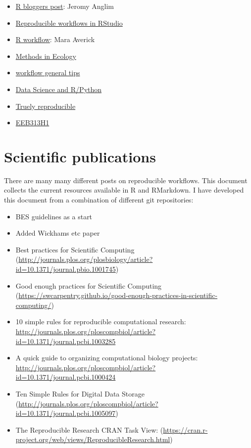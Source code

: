 \documentclass[
]{book}
\providecommand{\tightlist}{%
  \setlength{\itemsep}{0pt}\setlength{\parskip}{0pt}}
\begin{document}
\begin{itemize}
\tightlist
\item
  \href{https://www.r-bloggers.com/reproducible-research-and-r-workflow/}{R bloggers post}: Jeromy Anglim
\item
  \href{https://cyberhelp.sesync.org/basic-git-lesson/2016/08/25/}{Reproducible workflows in RStudio}
\item
  \href{https://maraaverick.rbind.io/2017/09/r-workflow-fun/}{R workflow}: Mara Averick
\item
  \href{https://methodsblog.com/2016/10/05/reproducibility-with-r/}{Methods in Ecology}
\item
  \href{https://csgillespie.github.io/efficientR/workflow.html}{workflow general tips}
\item
  \href{https://community.rstudio.com/t/data-science-project-template-for-r/3230}{Data Science and R/Python}
\item
  \href{https://timogrossenbacher.ch/2017/07/a-truly-reproducible-r-workflow/}{Truely reproducible}
\item
  \href{https://uoftcoders.github.io/rcourse/lec16-rmarkdown.html}{EEB313H1}
\end{itemize}

\hypertarget{scientific-publications}{%
\section{Scientific publications}\label{scientific-publications}}

There are many many different posts on reproducible workflows. This document collects the current resources available in R and RMarkdown. I have developed this document from a combination of different git repositories:

\begin{itemize}
\item
  BES guidelines as a start
\item
  Added Wickhams etc paper
\item
  Best practices for Scientific Computing (\url{http://journals.plos.org/plosbiology/article?id=10.1371/journal.pbio.1001745})
\item
  Good enough practices for Scientific Computing (\url{https://swcarpentry.github.io/good-enough-practices-in-scientific-computing/})
\item
  10 simple rules for reproducible computational research: \url{http://journals.plos.org/ploscompbiol/article?id=10.1371/journal.pcbi.1003285}
\item
  A quick guide to organizing computational biology projects: \url{http://journals.plos.org/ploscompbiol/article?id=10.1371/journal.pcbi.1000424}
\item
  Ten Simple Rules for Digital Data Storage (\url{http://journals.plos.org/ploscompbiol/article?id=10.1371/journal.pcbi.1005097})
\item
  The Reproducible Research CRAN Task View: (\url{https://cran.r-project.org/web/views/ReproducibleResearch.html})
\end{itemize}
\end{document}
